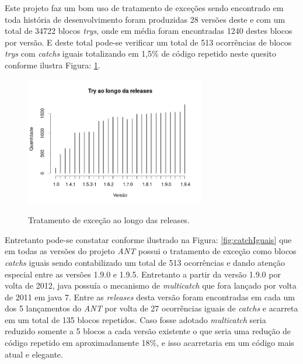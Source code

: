 Este projeto faz um bom uso de tratamento de exceções sendo encontrado em toda história de desenvolvimento foram produzidas 28 versões deste e com um total de 34722 blocos \textit{trys}, onde em média foram encontradas 1240 destes blocos por versão. E deste total pode-se verificar um total de 513 ocorrências de blocos \textit{trys} com \textit{catchs} iguais totalizando em 1,5\% de código repetido neste quesito conforme ilustra Figura: \ref{fig:TrysAnt}.\\

\begin{figure}[h]
	\center
	\includegraphics[width=0.7\textwidth]{Imagens/trysAnt}
	\label{fig:TrysAnt}
	\caption{Tratamento de exceção ao longo das releases.}
\end{figure}

Entretanto pode-se constatar conforme ilustrado na Figura: \ref{fig:catchIguais} que em todas as versões do projeto \textit{ANT} possui o tratamento de exceção como blocos \textit{catchs} iguais sendo contabilizado um total de 513 ocorrências e dando atenção especial entre as versões 1.9.0 e 1.9.5. Entretanto a partir da versão 1.9.0 por volta de 2012, java possuía o mecanismo de \textit{multicatch} que fora lançado por volta de 2011 em java 7. Entre as \textit{releases} desta versão foram encontradas em cada um dos 5 lançamentos do \textit{ANT} por volta de 27 ocorrências iguais de \textit{catchs} e acarreta em um total de 135 blocos repetidos. Caso fosse adotado \textit{multicatch} seria reduzido somente a 5 blocos a cada versão existente o que seria uma redução de código repetido em aproximadamente 18\%, e isso acarretaria em um código mais atual e elegante.\\


